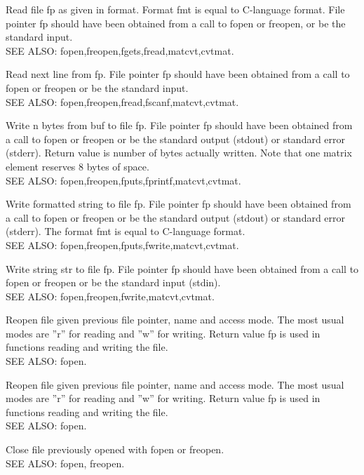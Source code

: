 Read file fp as given in format. Format fmt is equal to C-language format. File pointer fp should have been obtained from a call to fopen or freopen, or be the standard input. \\
SEE ALSO: fopen,freopen,fgets,fread,matcvt,cvtmat. 

Read next line from fp. File pointer fp should have been obtained from a call to fopen or freopen or be the standard input. \\ 
SEE ALSO: fopen,freopen,fread,fscanf,matcvt,cvtmat. 

Write n bytes from buf to file fp. File pointer fp should have been obtained from a call to fopen or freopen or be the standard output (stdout) or standard error (stderr). Return value is number of bytes actually written. 
Note that one matrix element reserves 8 bytes of space. \\
SEE ALSO: fopen,freopen,fputs,fprintf,matcvt,cvtmat. 

Write formatted string to file fp. File pointer fp should have been obtained from a call to fopen or freopen or be the standard output (stdout) or standard error (stderr). The format fmt is equal to C-language format. \\
SEE ALSO: fopen,freopen,fputs,fwrite,matcvt,cvtmat. 

Write string str to file fp. File pointer fp should have been obtained from a call to fopen or freopen or be the standard input (stdin). \\SEE ALSO: fopen,freopen,fwrite,matcvt,cvtmat. 

Reopen file given previous file pointer, name and access mode. The most usual modes are ''r'' for reading and ''w'' for writing. Return value fp is used in functions reading and writing the file. \\
SEE ALSO: fopen. 

Reopen file given previous file pointer, name and access mode. The most usual modes are ''r'' for reading and ''w'' for writing. Return value fp is used in functions reading and writing the file. \\
SEE ALSO: fopen. 

Close file previously opened with fopen or freopen. \\
SEE ALSO: fopen, freopen. 

